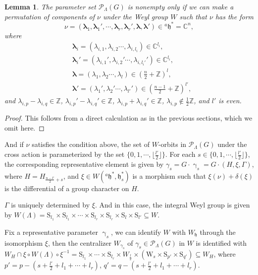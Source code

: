 \documentclass[12pt, a4paper]{amsart}
\numberwithin{equation}{section}
\newtheorem{lem}[thm]{Lemma}
\newcommand{\blam}{{\boldsymbol{\lambda}}}
\newcommand{\BC}{{\mathbb {C}}}
\newcommand{\BZ}{{\mathbb {Z}}}
\newcommand{\CP}{{\mathcal {P}}}
\newcommand{\fh}{\mathfrak{h}}
\begin{document}
\begin{lem}
    The parameter set $\mathscr{P}_{\Lambda}(G)$ is nonempty only if we can make a permutation of components of $\nu$ under the Weyl group $W$ such that $\nu$ has the form
\begin{equation}
    \nu = (\blam_1, \blam_1', \cdots, \blam_r, \blam_r', \blam,\blam') \in {^{a}\fh}^* = \BC^n,
\end{equation}
where 
\begin{align}
    &\blam_i = (\lambda_{i,1}, \lambda_{i,2} \cdots , \lambda_{i,l_i} ) \in \BC^{l_i},\\
    &\blam_i' = (\lambda_{i,1}', \lambda_{i,2}' \cdots , \lambda_{i,l_i'}' ) \in \BC^{l_i},\\
    &\blam = (\lambda_{1}, \lambda_{2} \cdots , \lambda_{l} ) \in (\frac{n}{2}+ \BZ)^{l},\\
    &\blam' = (\lambda_{1}', \lambda_{2}' \cdots , \lambda_{l'}' ) \in (\frac{n-1}{2}+ \BZ)^{l'},
\end{align}
and $\lambda_{i,p} - \lambda_{i,q} \in \BZ$, $\lambda_{i,p}' - \lambda_{i,q}' \in \BZ$, $\lambda_{i,p} + \lambda_{i,q}' \in \BZ$, $\lambda_{i,p} \notin \frac{1}{2}\BZ$, and $l'$ is even. 
\end{lem}

\begin{proof}
    This follows from a direct calculation as in the previous sections, which we omit here.
\end{proof}




And if $\nu$ satisfies the condition above, the set of $W$-orbits in $\CP_{\Lambda}(G)$ under the cross action is parameterized by the set $\{0,1,\cdots,\lfloor \frac{l'}{2} \rfloor\}$. For each $s \in \{0,1,\cdots,\lfloor \frac{l'}{2} \rfloor\}$, the corresponding representative element is given by $\gamma_s =G \cdot \upgamma_s = G \cdot (H, \xi, \Gamma)$, where $H = H_{\frac{n-l'}{2} + s}$, and $\xi \in W({^{a}\fh^*},\fh_s^*)$ is a morphism such that $\xi(\nu) + \delta(\xi)$ is the differential of a group character on $H$.


$\Gamma$ is uniquely determined by $\xi$. And in this case, the integral Weyl group is given by $W(\Lambda) =  \mathrm{S}_{l_1} \times \mathrm{S}_{l_1} \times \cdots \times \mathrm{S}_{l_r} \times \mathrm{S}_{l_r} \times \mathrm{S}_{l} \times \mathrm{S}_{l'} \subseteq W$.

Fix a representative parameter $\upgamma_s$, we can identify $W$ with $W_{\fh}$ through the isomorphism $\xi$, then the centralizer $W_{{\gamma_{s}}}$ of ${\gamma_{s}} \in \CP_{\Lambda}(G)$ in $W$ is identified with $W_{H} \cap \xi \circ W(\Lambda) \circ \xi^{-1} = \mathrm{S}_{l_1} \times \cdots \times \mathrm{S}_{l_r} \times W_{\frac{l}{2}} \times (\mathrm{W}_{s} \times \mathrm{S}_{p'} \times \mathrm{S}_{q'}) \subseteq W_{H}$, where $p' = p - (s + \frac{l'}{2} + l_1 + \cdots + l_r) $, $q' = q - (s + \frac{l'}{2} + l_1 + \cdots + l_r)$.
\end{document}
